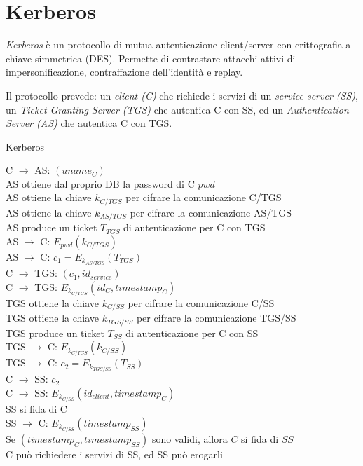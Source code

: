 \section{Kerberos}
\textit{Kerberos} è un protocollo di mutua autenticazione client/server con crittografia a chiave simmetrica (DES).
Permette di contrastare attacchi attivi di impersonificazione, contraffazione dell'identità e replay.

Il protocollo prevede: un \textit{client (C)} che richiede i servizi di un \textit{service server (SS)}, un \textit{Ticket-Granting Server (TGS)} che autentica C con SS, ed un \textit{Authentication Server (AS)} che autentica C con TGS.

\bigskip
\begin{algorithm}[H]
  \caption{Kerberos}
  \label{alg:kerberos}
  \SetAlgoNoLine
  C $\rightarrow$ AS: $(uname_{C})$\\
  AS ottiene dal proprio DB la password di C $pwd$\\
  AS ottiene la chiave $k_{C/TGS}$ per cifrare la comunicazione C/TGS\\
  AS ottiene la chiave $k_{AS/TGS}$ per cifrare la comunicazione AS/TGS\\
  AS produce un ticket $T_{TGS}$ di autenticazione per C con TGS\\
  AS $\rightarrow$ C: $E_{pwd}(k_{C/TGS})$\\
  AS $\rightarrow$ C: $c_{1}=E_{k_{AS/TGS}}(T_{TGS})$\\
  C $\rightarrow$ TGS: $(c_{1},id_{service})$\\
  C $\rightarrow$ TGS: $E_{k_{C/TGS}}(id_{C},timestamp_{C})$\\
  TGS ottiene la chiave $k_{C/SS}$ per cifrare la comunicazione C/SS\\
  TGS ottiene la chiave $k_{TGS/SS}$ per cifrare la comunicazione TGS/SS\\
  TGS produce un ticket $T_{SS}$ di autenticazione per C con SS\\
  TGS $\rightarrow$ C: $E_{k_{C/TGS}}(k_{C/SS})$\\
  TGS $\rightarrow$ C: $c_{2}=E_{k_{TGS/SS}}(T_{SS})$\\
  C $\rightarrow$ SS: $c_{2}$\\
  C $\rightarrow$ SS: $E_{k_{C/SS}}(id_{client},timestamp_{C})$\\
  SS si fida di C\\
  SS $\rightarrow$ C: $E_{k_{C/SS}}(timestamp_{SS})$\\
  Se $(timestamp_{C},timestamp_{SS})$ sono validi, allora $C$ si fida di $SS$\\
  C può richiedere i servizi di SS, ed SS può erogarli
\end{algorithm}

